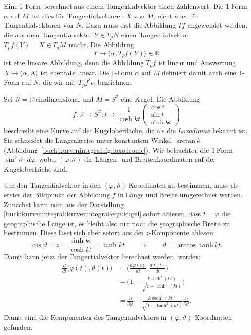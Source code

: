 Eine $1$-Form berechnet aus einem Tangentialvektor einen Zahlenwert.
Die $1$-Form $\alpha$ auf $M$ tut dies für Tangentialvektoren $X$ von
$M$, nicht aber für Tangentialvektoren von $N$.
Dazu muss erst die Abbildung $Tf$ angewendet werden, die aus dem
Tangentialvektor $Y\in T_pN$ einen Tangentialvektor $T_pf(Y)=X\in T_qM$
macht.
Die Abbildung
\[
Y\mapsto \langle \alpha, T_pf(Y)\rangle \in \mathbb{R}
\]
ist eine lineare Abbildung, denn die Abbildung $T_pf$ ist linear und
Auswertung $X\mapsto \langle\alpha,X\rangle$ ist ebenfalls linear.
Die $1$-Form $\alpha$ auf $M$ definiert damit auch eine $1$-Form auf
$N$, die wir mit $T_pf^*\alpha$ bezeichnen.

\begin{beispiel}
\label{buch:kurvenintegral:kurvenintegral:beispiel:loxodrome}
%
Sei $N=\mathbb{R}$ eindimensional und $M=S^2$ eine Kugel.
Die Abbildung 
\begin{equation}
f
\colon
\mathbb{R}\to S^2
:
t
\mapsto 
\frac{1}{\cosh kt}
\begin{pmatrix}
\cos t\\
\sin t\\
\sinh kt
\end{pmatrix}
\label{buch:kurvenintegral:kurvenintegral:eqn:kugel}
\end{equation}
beschreibt eine Kurve auf der Kugeloberfläche, die als die
\emph{Loxodrome} bekannt ist.
%
Sie schneidet die Längenkreise unter konstantem Winkel $\arctan k$
(Abbildung~\ref{buch:kurvenintegral:fig:loxodrome}).
Wir betrachten die $1$-Form $\sin^2\vartheta\cdot d\varphi$, wobei
$(\varphi,\vartheta)$ die Längen- und Breitenkoordinaten auf der
Kugeloberfläche sind.

Um den Tangentialvektor in den $(\varphi,\vartheta)$-Koordinaten zu
bestimmen, muss als erstes der Bildpunkt der Abbildung $f$ in Länge
und Breite umgerechnet werden.
Zunächst kann man aus der Darstellung
\eqref{buch:kurvenintegral:kurvenintegral:eqn:kugel}
sofort ablesen, dass $t=\varphi$ die geographische Länge ist,
es bleibt also nur noch die geographische Breite zu bestimmen.
Diese lässt sich aber sofort aus der $z$-Komponente ablesen:
\[
\cos\vartheta
=
z
=
\frac{\sinh kt}{\cosh kt}
=
\tanh kt
\qquad\Rightarrow\qquad
\vartheta = \arccos\tanh kt.
\]
Damit kann jetzt der Tangentialvektor berechnet werden, werden:
\begin{align*}
\frac{d}{dt} \bigl(\varphi(t),\vartheta(t)\bigr)
&=
\biggl(
\frac{d\varphi(t)}{dt},
\frac{d\vartheta(t)}{dt}
\biggr)
\\
&=
\biggl(1,
-\frac{k\operatorname{sech}^2(kt)}{\sqrt{1-\tanh^2(kt)}}
\biggr)
\\
&=
\frac{\partial}{\partial \varphi}
-
\frac{k\operatorname{sech}^2(kt)}{\sqrt{1-\tanh^2(kt)}}
\frac{\partial}{\partial\vartheta}
.
\end{align*}
Damit sind die Komponenten des Tangentialvektors in
$(\varphi,\vartheta)$-Koordinaten gefunden.


\end{beispiel}
